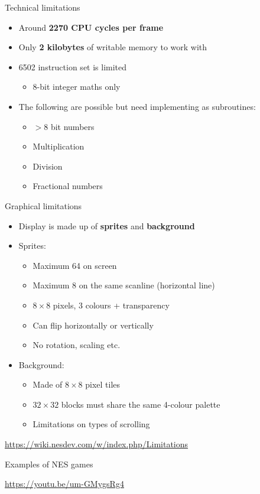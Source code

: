 \begin{frame}{Technical limitations}
	\begin{itemize}
		\pause\item Around \textbf{2270 CPU cycles per frame}
		\pause\item Only \textbf{2 kilobytes} of writable memory to work with
		\pause\item 6502 instruction set is limited
			\begin{itemize}
				\pause\item 8-bit integer maths only
			\end{itemize}
		\pause\item The following are possible but need implementing as subroutines:
			\begin{itemize}
				\pause\item $>8$ bit numbers
				\pause\item Multiplication
				\pause\item Division
				\pause\item Fractional numbers
			\end{itemize}
	\end{itemize}
\end{frame}

\begin{frame}{Graphical limitations}
	\begin{itemize}
		\pause\item Display is made up of \textbf{sprites} and \textbf{background}
		\pause\item Sprites:
			\begin{itemize}
				\pause\item Maximum 64 on screen
				\pause\item Maximum 8 on the same scanline (horizontal line)
				\pause\item $8 \times 8$ pixels, 3 colours + transparency
				\pause\item Can flip horizontally or vertically
				\pause\item No rotation, scaling etc.
			\end{itemize}
		\pause\item Background:
			\begin{itemize}
				\pause\item Made of $8 \times 8$ pixel tiles
				\pause\item $32 \times 32$ blocks must share the same 4-colour palette
				\pause\item Limitations on types of scrolling
			\end{itemize}
	\end{itemize}
\end{frame}

\begin{frame}
	\begin{center}
		\url{https://wiki.nesdev.com/w/index.php/Limitations}
	\end{center}
\end{frame}

\begin{frame}{Examples of NES games}
	\begin{center}
		\url{https://youtu.be/um-GMygsRg4}
	\end{center}
\end{frame}
